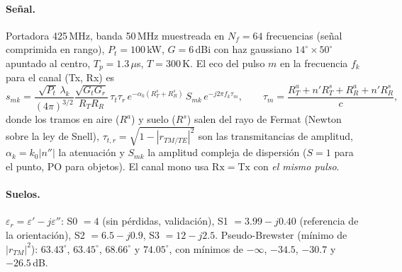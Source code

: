 \paragraph{Señal.} Portadora 425\,MHz, banda 50\,MHz muestreada en $N_f=64$
frecuencias (señal comprimida en rango), $P_t=100$\,kW, $G=6$\,dBi con haz
gaussiano $14^{\circ}\times50^{\circ}$ apuntado al centro, $T_p=1.3\,\mu$s, $T=300$\,K.
El eco del pulso $m$ en la frecuencia $f_k$ para el canal (Tx, Rx) es
\begin{equation}
  s_{mk} = \frac{\sqrt{P_t}\,\lambda_k}{(4\pi)^{3/2}}
  \frac{\sqrt{G_tG_r}}{R_TR_R}\,\tau_t\tau_r\,
  e^{-\alpha_k(R^{s}_T+R^{s}_R)}\,S_{mk}\,e^{-j2\pi f_k\tau_m},
  \qquad \tau_m=\frac{R^a_T+n'R^s_T+R^a_R+n'R^s_R}{c},
  \label{eq:eco}
\end{equation}
donde los tramos en aire ($R^a$) y suelo ($R^s$) salen del rayo de Fermat
(Newton sobre la ley de Snell), $\tau_{t,r}=\sqrt{1-|r_{TM/TE}|^2}$ son las
transmitancias de amplitud, $\alpha_k=k_0|n''|$ la atenuación y $S_{mk}$ la
amplitud compleja de dispersión ($S=1$ para el punto, PO para objetos). El
canal mono usa $\mathrm{Rx}=\mathrm{Tx}$ con \emph{el mismo pulso}.

\paragraph{Suelos.} $\varepsilon_r=\varepsilon'-j\varepsilon''$: S0 $=4$ (sin
pérdidas, validación), S1 $=3.99-j0.40$ (referencia de la orientación),
S2 $=6.5-j0.9$, S3 $=12-j2.5$. Pseudo-Brewster (mínimo de $|r_{TM}|^2$):
$63.43^{\circ}$, $63.45^{\circ}$, $68.66^{\circ}$ y $74.05^{\circ}$, con mínimos de
$-\infty$, $-34.5$, $-30.7$ y $-26.5$\,dB.

